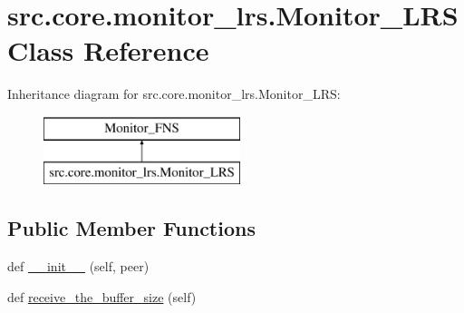 \hypertarget{classsrc_1_1core_1_1monitor__lrs_1_1Monitor__LRS}{}\section{src.\+core.\+monitor\+\_\+lrs.\+Monitor\+\_\+\+L\+R\+S Class Reference}
\label{classsrc_1_1core_1_1monitor__lrs_1_1Monitor__LRS}
Inheritance diagram for src.\+core.\+monitor\+\_\+lrs.\+Monitor\+\_\+\+L\+R\+S\+:\begin{figure}[H]
\begin{center}
\leavevmode
\includegraphics[height=2.000000cm]{classsrc_1_1core_1_1monitor__lrs_1_1Monitor__LRS}
\end{center}
\end{figure}
\subsection*{Public Member Functions}
\begin{DoxyCompactItemize}
\item 
def \hyperlink{classsrc_1_1core_1_1monitor__lrs_1_1Monitor__LRS_a6d3c9e648737a8d569a05af6cbd79b62}{\+\_\+\+\_\+init\+\_\+\+\_\+} (self, peer)
\item 
def \hyperlink{classsrc_1_1core_1_1monitor__lrs_1_1Monitor__LRS_a4ac336a53720b575264acd15683ace66}{receive\+\_\+the\+\_\+buffer\+\_\+size} (self)
\end{DoxyCompactItemize}
